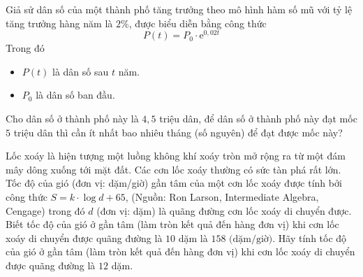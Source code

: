\begin{bt}%
	Giả sử dân số của một thành phố tăng trưởng theo mô hình hàm số mũ với tỷ lệ tăng trưởng hàng năm là $2\%$, được biểu diễn bằng công thức
	$$P(t)=P_0\cdot \mathrm{e}^{0{,}02t}$$
	Trong đó
	\begin{itemize}
		\item $P(t)$ là dân số sau $t$ năm.
		\item $P_0$ là dân số ban đầu.
	\end{itemize}
	Cho dân số ở thành phố này là $4{,}5$ triệu dân, để dân số ở thành phố này đạt mốc $5$ triệu dân thì cần ít nhất bao nhiêu tháng (số nguyên) để đạt được mốc này?
\end{bt}

\begin{bt}%

	Lốc xoáy là hiện tượng một luồng không khí xoáy tròn mở rộng ra từ một đám mây dông xuống tới mặt đất. Các cơn lốc xoáy thường có sức tàn phá rất lớn. Tốc độ của gió (đơn vị: dặm/giờ) gần tâm của một cơn lốc xoáy được tính bởi công thức $S=k\cdot\log d+65$, (Nguồn: Ron Larson, Intermediate Algebra, Cengage) trong đó $d$ (đơn vị: dặm) là quãng đường cơn lốc xoáy di chuyển được. Biết  tốc độ của gió ở gần tâm (làm tròn kết quả đến hàng đơn vị) khi cơn lốc xoáy di chuyển được quãng đường là $ 10 $ dặm là $ 158\text { (dặm/giờ)} $. Hãy tính tốc độ của gió ở gần tâm (làm tròn kết quả đến hàng đơn vị) khi cơn lốc xoáy di chuyển được quãng đường là $ 12 $ dặm.
\end{bt}

